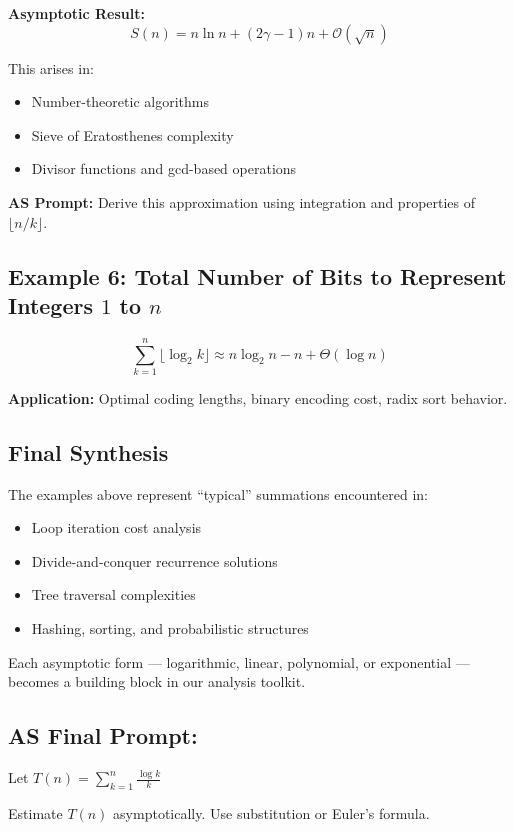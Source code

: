 \documentclass{article}
\begin{document}
\textbf{Asymptotic Result:}
\[
S(n) = n \ln n + (2\gamma - 1)n + \mathcal{O}(\sqrt{n})
\]

This arises in:
\begin{itemize}
    \item Number-theoretic algorithms
    \item Sieve of Eratosthenes complexity
    \item Divisor functions and gcd-based operations
\end{itemize}

\textbf{AS Prompt:} Derive this approximation using integration and properties of $\lfloor n/k \rfloor$.

\subsection*{Example 6: Total Number of Bits to Represent Integers $1$ to $n$}

\[
\sum_{k=1}^{n} \lfloor \log_2 k \rfloor
\approx n \log_2 n - n + \Theta(\log n)
\]

\textbf{Application:} Optimal coding lengths, binary encoding cost, radix sort behavior.

\subsection*{Final Synthesis}

The examples above represent “typical” summations encountered in:
\begin{itemize}
    \item Loop iteration cost analysis
    \item Divide-and-conquer recurrence solutions
    \item Tree traversal complexities
    \item Hashing, sorting, and probabilistic structures
\end{itemize}

Each asymptotic form — logarithmic, linear, polynomial, or exponential — becomes a building block in our analysis toolkit.

\subsection*{AS Final Prompt:}

Let $T(n) = \sum_{k=1}^n \frac{\log k}{k}$

Estimate $T(n)$ asymptotically. Use substitution or Euler’s formula.
\end{document}
